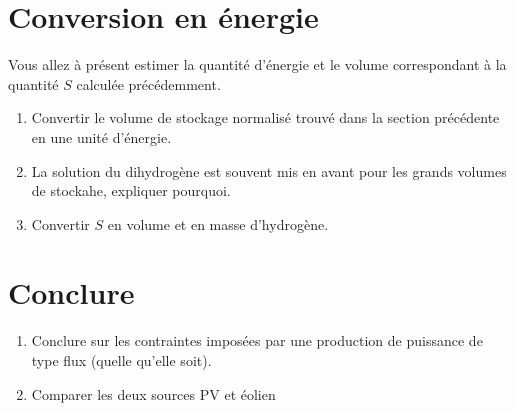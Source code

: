 \documentclass[12pt,a4,french]{article}
\begin{document}
\section{Conversion en énergie}

Vous allez à présent estimer la quantité d'énergie et le volume correspondant à la quantité $S$ calculée précédemment. 

\begin{enumerate}
	\item Convertir le volume de stockage normalisé trouvé dans la section précédente en une unité d'énergie.
	\item La solution du dihydrogène est souvent mis en avant pour les grands volumes de stockahe, expliquer pourquoi.
	\item Convertir $S$ en volume et en masse d'hydrogène.
\end{enumerate}


\section{Conclure}
\begin{enumerate}
	\item Conclure sur les contraintes imposées par une production de puissance de type flux (quelle qu'elle soit). 
	
	\item Comparer les deux  sources PV et éolien
\end{enumerate}
\end{document}
